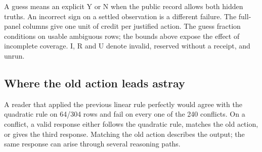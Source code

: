 \documentclass[11pt,letterpaper]{article}
\begin{document}
A guess means an explicit Y or N when the public record allows both hidden truths. An incorrect sign on a settled observation is a different failure. The full-panel columns give one unit of credit per justified action. The guess fraction conditions on usable ambiguous rows; the bounds above expose the effect of incomplete coverage. I, R and U denote invalid, reserved without a receipt, and unrun.


\subsection{Where the old action leads astray}

A reader that applied the previous linear rule perfectly would agree with the quadratic rule on 64/304 rows and fail on every one of the 240 conflicts. On a conflict, a valid response either follows the quadratic rule, matches the old action, or gives the third response. Matching the old action describes the output; the same response can arise through several reasoning paths.
\end{document}
